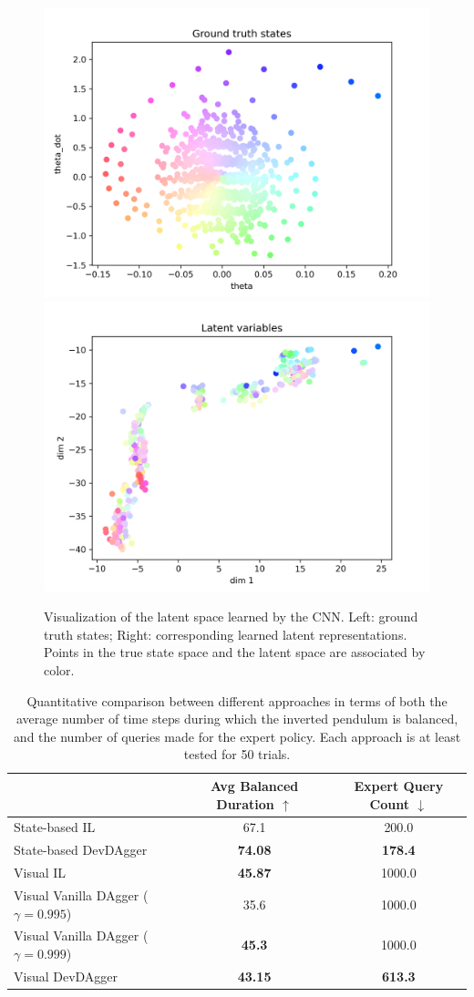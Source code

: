 \documentclass[11pt, reqno, letterpaper, twoside]{amsart}
\begin{document}
\begin{figure}[ht]
	\centering
	\includegraphics[width=0.4\linewidth]{imgs/latentVis_gt_states_0.png}
	\includegraphics[width=0.4\linewidth]{imgs/latentVis_latents_0.png}
	\caption{Visualization of the latent space learned by the CNN. Left: ground truth states; Right: corresponding learned latent representations. Points in the true state space and the latent space are associated by color.}
	\label{fig:latent}
\end{figure}

\begin{table}[ht]
	\centering
	\begin{tabular}{|l|c|c|}
		\hline
		                                         & Avg Balanced Duration $\uparrow$ & Expert Query Count $\downarrow$ \\
		\hline
		State-based IL                           & 67.1                             & 200.0                           \\
		\hline
		State-based DevDAgger                    & \textbf{74.08}                   & \textbf{178.4}                  \\
		\hhline{|=|=|=|}
		Visual IL                                & \textbf{45.87}                   & 1000.0                          \\
		\hline
		Visual Vanilla DAgger ($\gamma = 0.995$) & 35.6                             & 1000.0                          \\
		\hline
		Visual Vanilla DAgger ($\gamma = 0.999$) & \textbf{45.3}                    & 1000.0                          \\
		\hline
		Visual DevDAgger                         & \textbf{43.15}                   & \textbf{613.3}                  \\
		\hline
	\end{tabular}
	\caption{Quantitative comparison between different approaches in terms of both the average number of time steps during which the inverted pendulum is balanced, and the number of queries made for the expert policy. Each approach is at least tested for 50 trials.}
	\label{tab:comparison}
\end{table}
\end{document}
